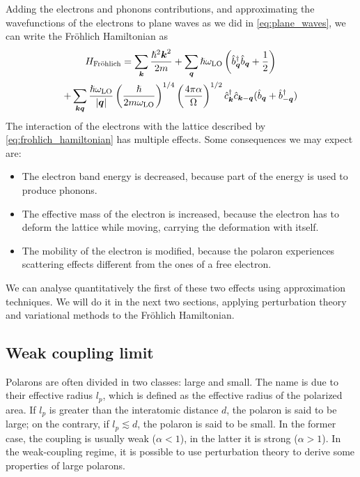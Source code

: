 Adding the electrons and phonons contributions, and approximating the wavefunctions of the electrons to plane waves as we did in \cref{eq:plane_waves}, we can write the Fröhlich Hamiltonian as
\begin{multline} \label{eq:frohlich_hamiltonian}
    H_\text{Fröhlich} = \sum_{\mathbf{\boldsymbol{k}}} \frac{\hslash^2\mathbf{\boldsymbol{k}}^2}{2m}
    + \sum_{\mathbf{\boldsymbol{q}}} \hslash \omega_\text{LO} \left( \hat{b}^\dagger_{ \mathbf{\boldsymbol{q}}} \hat{b}_{ \mathbf{\boldsymbol{q}}} + \frac{1}{2} \right)
    \\ + \sum_{\mathbf{\boldsymbol{k}}\mathbf{\boldsymbol{q}}} \frac{\hslash \omega_\text{LO}}{|\mathbf{\boldsymbol{q}}|} \left(\frac{\hslash}{2m\omega_\text{LO}}\right)^{1/4} \left(\frac{4\pi\alpha}{\Omega}\right)^{1/2} \hat{c}^\dagger_{\mathbf{\boldsymbol{k}}}\hat{c}_{\mathbf{\boldsymbol{k}}-\mathbf{\boldsymbol{q}}} (\hat{b}_{\mathbf{\boldsymbol{q}}} + \hat{b}^\dagger_{-\mathbf{\boldsymbol{q}}})
\end{multline}
The interaction of the electrons with the lattice described by \cref{eq:frohlich_hamiltonian} has multiple effects. Some consequences we may expect are:
\begin{itemize}
    \item The electron band energy is decreased, because part of the energy is used to produce phonons.
    \item The effective mass of the electron is increased, because the electron has to deform the lattice while moving, carrying the deformation with itself.
    \item The mobility of the electron is modified, because the polaron experiences scattering effects different from the ones of a free electron.
\end{itemize}
We can analyse quantitatively the first of these two effects using approximation techniques. We will do it in the next two sections, applying perturbation theory and variational methods to the Fröhlich Hamiltonian.

\subsection{Weak coupling limit} \label{sec:weak_frohlich}
Polarons are often divided in two classes: large and small. The name is due to their effective radius $l_p$, which is defined as the effective radius of the polarized area. If $l_p$ is greater than the interatomic distance $d$, the polaron is said to be large; on the contrary, if $l_p \lesssim d$, the polaron is said to be small. In the former case, the coupling is usually weak ($\alpha < 1$), in the latter it is strong ($\alpha > 1$). In the weak-coupling regime, it is possible to use perturbation theory to derive some properties of large polarons.

